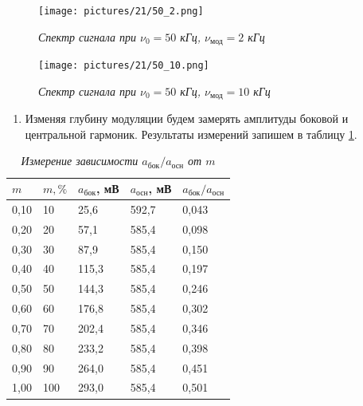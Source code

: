 \documentclass[a4paper,12pt]{article}
\begin{document}
\FloatBarrier
\begin{figure}[!ht]
        \centering
	\texttt{[image: pictures/21/50\_2.png]}
	\caption{\textit{Спектр сигнала при $\nu_0 = 50$ кГц, $\nu_\text{мод} = 2$ кГц}}
	\label{pic:mod-1}
\end{figure}

\begin{figure}[!ht]
        \centering
	\texttt{[image: pictures/21/50\_10.png]}
	\caption{\textit{Спектр сигнала при $\nu_0 = 50$ кГц, $\nu_\text{мод} = 10$ кГц}}
	\label{pic:mod-2}
\end{figure}

\FloatBarrier

\begin{enumerate}[resume]
    \item Изменяя глубину модуляции будем замерять амплитуды боковой и центральной гармоник. Результаты измерений запишем в таблицу \ref{table:5}.
\end{enumerate}

\FloatBarrier
\begin{table}[!ht]
    \centering
    \caption{\textit{Измерение зависимости $a_\text{бок}/a_\text{осн}$ от $m$}}
    \begin{tabular}{|l|l|l|l|l|}
        \hline
        $m$ & $m, \%$ & $a_\text{бок}$, мВ & $a_\text{осн}$, мВ & $a_\text{бок}/a_\text{осн}$ \\ \hline
        0,10 & 10    & 25,6       & 592,7      & 0,043 \\ \hline
        0,20 & 20    & 57,1       & 585,4      & 0,098 \\ \hline
        0,30 & 30    & 87,9       & 585,4      & 0,150 \\ \hline
        0,40 & 40    & 115,3      & 585,4      & 0,197 \\ \hline
        0,50 & 50    & 144,3      & 585,4      & 0,246 \\ \hline
        0,60 & 60    & 176,8      & 585,4      & 0,302 \\ \hline
        0,70 & 70    & 202,4      & 585,4      & 0,346 \\ \hline
        0,80 & 80    & 233,2      & 585,4      & 0,398 \\ \hline
        0,90 & 90    & 264,0      & 585,4      & 0,451 \\ \hline
        1,00 & 100   & 293,0      & 585,4      & 0,501 \\ \hline 
    \end{tabular}
    \label{table:5}
\end{table}
\FloatBarrier
\end{document}
